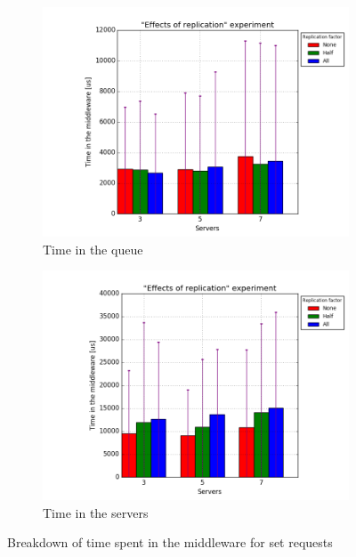 \documentclass[11pt]{article}
\begin{document}

\begin{figure}
\centering
\begin{subfigure}{.5\textwidth}
	\centering
	\includegraphics[width=\linewidth]{plots/replication-set-queue}
	\caption{Time in the queue}
	\label{fig:replication-set-queue}
\end{subfigure}%
\begin{subfigure}{.5\textwidth}
	\centering
	\includegraphics[width=\linewidth]{plots/replication-set-servers}
	\caption{Time in the servers}
	\label{fig:replication-set-servers}
\end{subfigure}
\caption{Breakdown of time spent in the middleware for set requests}
\label{fig:replication-set-breakdown}
\end{figure}
\end{document}
